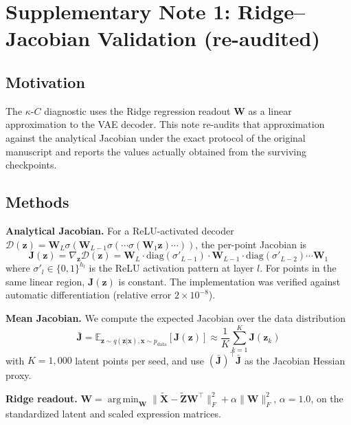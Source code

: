 \documentclass[11pt,a4paper]{article}
\newcommand{\Wmat}{\mathbf{W}}\newcommand{\Jmat}{\mathbf{J}}
\newcommand{\Xmat}{\mathbf{X}}\newcommand{\Zmat}{\mathbf{Z}}
\DeclareMathOperator*{\argmin}{arg\,min}
\begin{document}
\section*{Supplementary Note 1: Ridge--Jacobian Validation (re-audited)}
\label{sup:ridge_validation}

\subsection*{Motivation}

The $\kappa$-$C$ diagnostic uses the Ridge regression readout $\Wmat$ as a linear approximation to the VAE decoder. This note re-audits that approximation against the analytical Jacobian under the exact protocol of the original manuscript and reports the values actually obtained from the surviving checkpoints.

\subsection*{Methods}

\textbf{Analytical Jacobian.} For a ReLU-activated decoder $\mathcal{D}(\mathbf{z}) = \Wmat_L \sigma(\Wmat_{L-1} \sigma(\cdots \sigma(\Wmat_1\mathbf{z})\cdots))$, the per-point Jacobian is \begin{equation}
\Jmat(\mathbf{z}) = \nabla_{\mathbf{z}}\mathcal{D}(\mathbf{z}) = \Wmat_L \cdot \text{diag}(\sigma'_{L-1}) \cdot \Wmat_{L-1} \cdot \text{diag}(\sigma'_{L-2}) \cdots \Wmat_1
\end{equation}
where $\sigma'_l \in \{0,1\}^{h_l}$ is the ReLU activation pattern at layer $l$. For points in the same linear region, $\Jmat(\mathbf{z})$ is constant. The implementation was verified against automatic differentiation (relative error $2\times10^{-8}$).

\textbf{Mean Jacobian.} We compute the expected Jacobian over the data distribution \begin{equation}
\bar{\Jmat} = \mathbb{E}_{\mathbf{z} \sim q(\mathbf{z}|\mathbf{x}), \mathbf{x} \sim p_{\text{data}}}[\Jmat(\mathbf{z})] \approx \frac{1}{K}\sum_{k=1}^K \Jmat(\mathbf{z}_k)
\end{equation}
with $K=1{,}000$ latent points per seed, and use $(\bar{\Jmat})^\top\bar{\Jmat}$ as the Jacobian Hessian proxy.

\textbf{Ridge readout.} $\Wmat = \argmin_{\mathbf{W}} \|\tilde{\Xmat} - \tilde{\Zmat}\Wmat^\top\|_F^2 + \alpha\|\Wmat\|_F^2$, $\alpha=1.0$, on the standardized latent and scaled expression matrices.
\end{document}
